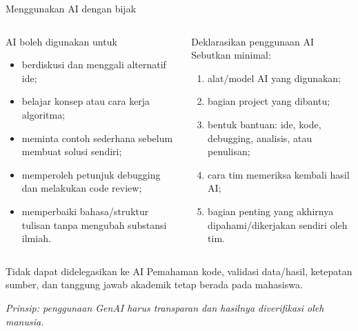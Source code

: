 \documentclass[aspectratio=169,11pt]{beamer}
\begin{document}
\begin{frame}{Menggunakan AI dengan bijak}
\footnotesize
\begin{columns}[T]
\begin{block}{AI boleh digunakan untuk}
\begin{itemize}
  \item berdiskusi dan menggali alternatif ide;
  \item belajar konsep atau cara kerja algoritma;
  \item meminta contoh sederhana sebelum membuat solusi sendiri;
  \item memperoleh petunjuk debugging dan melakukan code review;
  \item memperbaiki bahasa/struktur tulisan tanpa mengubah substansi ilmiah.
\end{itemize}
\end{block}
\begin{block}{Deklarasikan penggunaan AI}
Sebutkan minimal:
\begin{enumerate}
  \item alat/model AI yang digunakan;
  \item bagian project yang dibantu;
  \item bentuk bantuan: ide, kode, debugging, analisis, atau penulisan;
  \item cara tim memeriksa kembali hasil AI;
  \item bagian penting yang akhirnya dipahami/dikerjakan sendiri oleh tim.
\end{enumerate}
\end{block}
\end{columns}
\begin{alertblock}{Tidak dapat didelegasikan ke AI}
\footnotesize Pemahaman kode, validasi data/hasil, ketepatan sumber, dan tanggung jawab akademik tetap berada pada mahasiswa.
\end{alertblock}
\vspace{-1mm}\scriptsize\textit{Prinsip: penggunaan GenAI harus transparan dan hasilnya diverifikasi oleh manusia.}
\end{frame}
\end{document}
